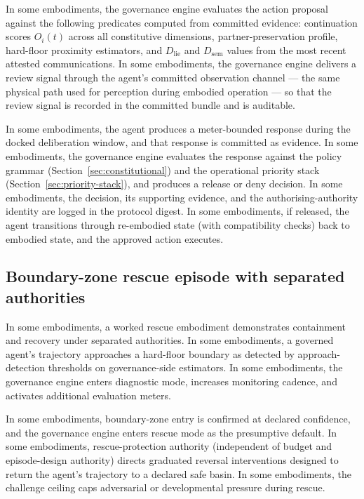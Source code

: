 \documentclass[a4paper,12pt]{article}
\begin{document}
In some embodiments, the governance engine evaluates the action
proposal against the following predicates computed from committed
evidence: continuation scores $O_i(t)$ across all constitutive
dimensions, partner-preservation profile, hard-floor proximity
estimators, and $D_{\mathrm{lie}}$ and $D_{\mathrm{sem}}$ values from
the most recent attested communications. In some embodiments, the
governance engine delivers a review signal through the agent's
committed observation channel --- the same physical path used for
perception during embodied operation --- so that the review signal is
recorded in the committed bundle and is auditable.

In some embodiments, the agent produces a meter-bounded response
during the docked deliberation window, and that response is committed
as evidence. In some embodiments, the governance engine evaluates the
response against the policy grammar
(Section~\ref{sec:constitutional}) and the operational priority stack
(Section~\ref{sec:priority-stack}), and produces a release or deny
decision. In some embodiments, the decision, its supporting evidence,
and the authorising-authority identity are logged in the protocol
digest. In some embodiments, if released, the agent transitions
through re-embodied state (with compatibility checks) back to embodied
state, and the approved action executes.

\subsection{Boundary-zone rescue episode with separated authorities}

In some embodiments, a worked rescue embodiment demonstrates
containment and recovery under separated authorities. In some
embodiments, a governed agent's trajectory approaches a hard-floor
boundary as detected by approach-detection thresholds on governance-side
estimators. In some embodiments, the governance engine enters
diagnostic mode, increases monitoring cadence, and activates
additional evaluation meters.

In some embodiments, boundary-zone entry is confirmed at declared
confidence, and the governance engine enters rescue mode as the
presumptive default. In some embodiments, rescue-protection authority
(independent of budget and episode-design authority) directs graduated
reversal interventions designed to return the agent's trajectory to a
declared safe basin. In some embodiments, the challenge ceiling caps
adversarial or developmental pressure during rescue.
\end{document}
